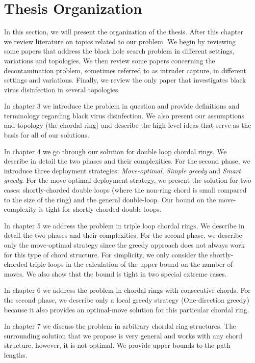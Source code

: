 
\section{Thesis Organization} 


In this section, we will present the organization of the thesis. After this chapter we review literature on topics related to our problem. We begin by reviewing some papers that address the black hole search problem in different settings, variations and topologies. We then review some papers concerning the decontamination problem, sometimes referred to as intruder capture, in different settings and variations. Finally, we review the only paper that investigates black virus disinfection in several topologies.

In chapter  3  we introduce the problem in question and provide definitions and terminology regarding black virus disinfection. We also present our assumptions and topology (the chordal ring) and describe the high level ideas that serve as the basis for all of our solutions.

In chapter 4 we go through our solution for double loop chordal rings. 
We describe in detail the two phases and  their complexities. For the second phase, we  introduce  three deployment strategies: {\em Move-optimal}, {\em Simple greedy} and {\em Smart greedy}. For the move-optimal deployment strategy, we present the solution for two cases: shortly-chorded double loops (where the non-ring chord is small compared to the size of the ring) and the general double-loop.  Our bound on the move-complexity is tight for shortly chorded double loops.

In chapter 5 we address the problem in  triple loop chordal rings. 
We describe in detail the two phases and  their complexities. For the second phase, we  describe only the move-optimal strategy since the greedy approach does not always work for this type of chord structure. For simplicity, we only consider  the shortly-chorded triple loops in the calculation of the upper bound on the number of moves. We also show that the  bound is tight in  two special extreme cases.

In chapter 6 we address the problem in chordal rings with consecutive chords.   For  the second phase, we describe only a local greedy strategy (One-direction greedy) because it also provides an optimal-move solution for this particular chordal ring.

In chapter 7 we discuss the problem in  arbitrary chordal ring structures. 
The surrounding solution that we propose is very general and works with any chord structure, however, it is not  optimal. We provide upper bounds to the path lengths. 


